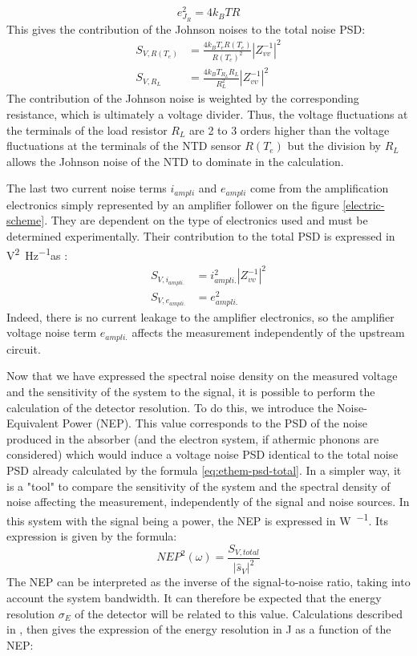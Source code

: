 \begin{equation}
e_{J_R}^2 = 4k_B T R
\end{equation}
This gives the contribution of the Johnson noises to the total noise PSD:
\begin{align}
S_{V,R(T_e)} &= \frac{4 k_B T_e R(T_e)}{R(T_e)^2} \left\vert Z_{vv}^{-1}\right\vert^2
\\
S_{V,R_L} &= \frac{4 k_B T_{R_L} R_L}{R_L^2} \left\vert Z_{vv}^{-1}\right\vert^2
\end{align}
The contribution of the Johnson noise is weighted by the corresponding resistance, which is ultimately a voltage divider. Thus, the voltage fluctuations at the terminals of the load resistor $R_L$ are 2 to 3 orders higher than the voltage fluctuations at the terminals of the NTD sensor $R(T_e)$ but the division by $R_L$ allows the Johnson noise of the NTD to dominate in the calculation.

The last two current noise terms $i_{ampli}$ and $e_{ampli}$ come from the amplification electronics simply represented by an amplifier follower on the figure \ref{electric-scheme}. They are dependent on the type of electronics used and must be determined experimentally. Their contribution to the total PSD is expressed in \si{\volt^2\per\Hz}as :
\begin{align}
\label{eq:ethem-noise-ampli}
S_{V,i_{ampli.}} &= i_{ampli.}^2 \left\vert Z_{vv}^{-1}\right\vert^2
\\
S_{V,e_{ampli.}} &= e_{ampli.}^2
\end{align}
Indeed, there is no current leakage to the amplifier electronics, so the amplifier voltage noise term $e_{ampli.}$ affects the measurement independently of the upstream circuit.

Now that we have expressed the spectral noise density on the measured voltage and the sensitivity of the system to the signal, it is possible to perform the calculation of the detector resolution. To do this, we introduce the Noise-Equivalent Power (NEP). This value corresponds to the PSD of the noise produced in the absorber (and the electron system, if athermic phonons are considered) which would induce a voltage noise PSD identical to the total noise PSD already calculated by the formula \ref{eq:ethem-psd-total}. In a simpler way, it is a "tool" to compare the sensitivity of the system and the spectral density of noise affecting the measurement, independently of the signal and noise sources. In this system with the signal being a power, the NEP is expressed in \si{\watt\per\sqrthz}. Its expression is given by the formula:
\begin{equation}
\label{eq:nep}
NEP^2(\omega) =  \frac{S_{V,total}}{|\hat{s}_V|^2}
\end{equation}
The NEP can be interpreted as the inverse of the signal-to-noise ratio, taking into account the system bandwidth. It can therefore be expected that the energy resolution $\sigma_E$ of the detector will be related to this value. Calculations described in
, then gives the expression of the energy resolution in \si{\joule} as a function of the NEP:

